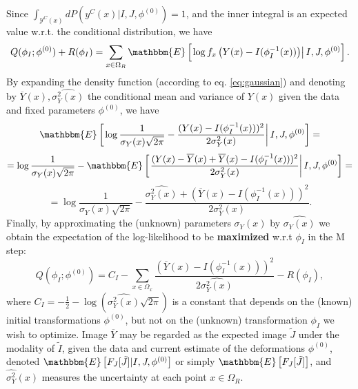 Since \hbox{$\int_{\mathcal{Y}^{C}(x)}dP(y^{C}(x) | I, J, \phi^{(0)}) = 1$}, and the inner integral
is an expected value w.r.t. the conditional distribution, we have
\begin{equation}
     Q(\phi_{I}; \phi^{(0)}) + R(\phi_{I}) = \sum_{x\in\Omega_{R}} \mathbbm{E} \left[\left.\log f_{x}\left(Y(x) - I(\phi^{-1}_{I}(x))\right) \right| I, J, \phi^{(0)}\right].
\end{equation}
By expanding the density function (according to eq. \eqref{eq:gaussian}) and denoting by $\overline{Y}(x), \widehat{\sigma^{2}_{Y}(x)}$ the conditional mean and variance of $Y(x)$
given the data and fixed parameters $\phi^{(0)}$, we have
\begin{equation}
    \mathbbm{E} \left[\left.\log \frac{1}{\sigma_{Y}(x)\sqrt{2\pi}} - \frac{(Y(x) - I(\phi^{-1}_{I}(x)))^{2}}{2\sigma^{2}_{Y}(x)}\right|I, J, \phi^{(0)} \right] =
\end{equation}
\begin{equation}
    = \log \frac{1}{\sigma_{Y}(x)\sqrt{2\pi}} - \mathbbm{E} \left[\left. \frac{(Y(x) - \overline{Y}(x) + \overline{Y}(x) - I(\phi^{-1}_{I}(x)))^{2}}{2\sigma^{2}_{Y}(x)}\right|I, J, \phi^{(0)} \right]=
\end{equation}
\begin{equation}
    = \log \frac{1}{\sigma_{Y}(x)\sqrt{2\pi}} - \frac{\widehat{\sigma^{2}_{Y}(x)} + (\overline{Y}(x) - I(\phi^{-1}_{I}(x)))^{2}}{2\sigma^{2}_{Y}(x)}.
\end{equation}
Finally, by approximating the (unknown) parameters $\sigma_{Y}(x)$ by $\widehat{\sigma_{Y}(x)}$ we obtain the expectation of the log-likelihood to be \textbf{maximized} w.r.t $\phi_{I}$ in the M step:
\begin{equation}
    Q(\phi_{I}; \phi^{(0)}) = C_{I} - \sum_{x\in\Omega_{x}}\frac{(\overline{Y}(x) - I(\phi^{-1}_{I}(x)))^{2}}{2\widehat{\sigma^{2}_{Y}(x)}} - R(\phi_{I}),
\end{equation}
where $C_{I} = -\frac{1}{2} - \log\left(\widehat{\sigma^{2}_{Y}(x)}\sqrt{2\pi}\right)$ is a constant that depends on the (known) initial transformations $\phi^{(0)}$, but not on the
(unknown) transformation $\phi_{I}$ we wish to optimize. Image $\overline{Y}$ may be regarded as the expected image $\tilde{J}$ under the modality of $\tilde{I}$, given the data and current estimate of the
deformations $\phi^{(0)}$, denoted $\mathbbm{E}\left[F_{J}[\tilde{J}]|I, J, \phi^{(0)}\right]$ or simply $\mathbbm{E}\left[F_{J}[\tilde{J}]\right]$, and $\widehat{\sigma^{2}_{Y}}(x)$ measures the uncertainty at each point
$x\in \Omega_{R}$.\\

